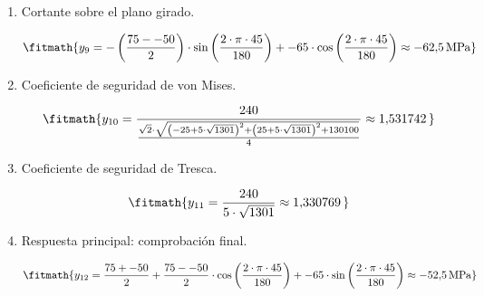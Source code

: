 \begin{enumerate}
\item Cortante sobre el plano girado.

\[\fitmath{y_{9}=-\left(\frac{75--50}{2}\right)\cdot \sin\left(\frac{2\cdot \pi\cdot 45}{180}\right)+-65\cdot \cos\left(\frac{2\cdot \pi\cdot 45}{180}\right)\approx -62{,}5\,\mathrm{MPa}}\]

\item Coeficiente de seguridad de von Mises.

\[\fitmath{y_{10}=\frac{240}{\frac{\sqrt{2}\cdot \sqrt{{\left(-25+5\cdot \sqrt{1301}\right)}^{2}+{\left(25+5\cdot \sqrt{1301}\right)}^{2}+130100}}{4}}\approx 1{,}531742\,}\]

\item Coeficiente de seguridad de Tresca.

\[\fitmath{y_{11}=\frac{240}{5\cdot \sqrt{1301}}\approx 1{,}330769\,}\]

\item Respuesta principal: comprobación final.

\[\fitmath{y_{12}=\frac{75+-50}{2}+\frac{75--50}{2}\cdot \cos\left(\frac{2\cdot \pi\cdot 45}{180}\right)+-65\cdot \sin\left(\frac{2\cdot \pi\cdot 45}{180}\right)\approx -52{,}5\,\mathrm{MPa}}\]

\end{enumerate}
